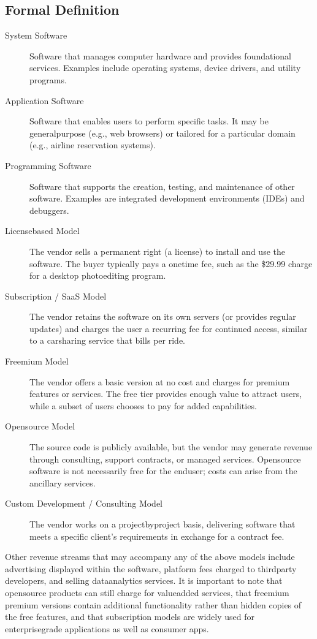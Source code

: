 \documentclass[12pt, a4paper]{article}
\begin{document}
\subsection{Formal Definition}
\begin{description}
  \item[System Software] Software that manages computer hardware and provides foundational services.  Examples include operating systems, device drivers, and utility programs.
  \item[Application Software] Software that enables users to perform specific tasks.  It may be generalpurpose (e.g., web browsers) or tailored for a particular domain (e.g., airline reservation systems).
  \item[Programming Software] Software that supports the creation, testing, and maintenance of other software.  Examples are integrated development environments (IDEs) and debuggers.
\end{description}

\begin{description}
  \item[Licensebased Model] The vendor sells a permanent right (a license) to install and use the software.  The buyer typically pays a onetime fee, such as the \$29.99 charge for a desktop photoediting program.
  \item[Subscription / SaaS Model] The vendor retains the software on its own servers (or provides regular updates) and charges the user a recurring fee for continued access, similar to a carsharing service that bills per ride.
  \item[Freemium Model] The vendor offers a basic version at no cost and charges for premium features or services.  The free tier provides enough value to attract users, while a subset of users chooses to pay for added capabilities.
  \item[Opensource Model] The source code is publicly available, but the vendor may generate revenue through consulting, support contracts, or managed services.  Opensource software is not necessarily free for the enduser; costs can arise from the ancillary services.
  \item[Custom Development / Consulting Model] The vendor works on a projectbyproject basis, delivering software that meets a specific client's requirements in exchange for a contract fee.
\end{description}

Other revenue streams that may accompany any of the above models include advertising displayed within the software, platform fees charged to thirdparty developers, and selling dataanalytics services.  It is important to note that opensource products can still charge for valueadded services, that freemium premium versions contain additional functionality rather than hidden copies of the free features, and that subscription models are widely used for enterprisegrade applications as well as consumer apps.
\end{document}
